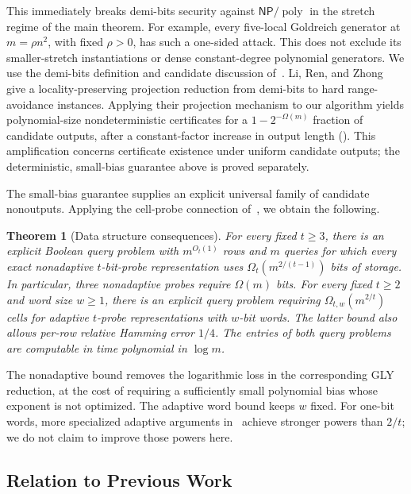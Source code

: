 \documentclass[letterpaper,11pt]{article}
\newtheorem{theorem}{Theorem}
\theoremstyle{definition}
\newcommand{\NP}{\mathsf{NP}}
\DeclareMathOperator{\poly}{poly}
\begin{document}
This immediately breaks demi-bits security against $\NP/\poly$
in the stretch regime of the main theorem. For example, every
five-local Goldreich generator at $m=\rho n^2$, with fixed $\rho>0$,
has such a one-sided attack. This does not exclude its smaller-stretch
instantiations or dense constant-degree polynomial generators.
We use the demi-bits definition and candidate discussion
of~\cite{RWZ26}. Li, Ren, and Zhong~\cite{LRZ26} give a
locality-preserving projection reduction from demi-bits to hard
range-avoidance instances. Applying their projection mechanism to
our algorithm yields polynomial-size nondeterministic certificates
for a $1-2^{-\Omega(m)}$ fraction of candidate outputs, after a
constant-factor increase in output length
(). This amplification concerns
certificate existence under uniform candidate outputs; the
deterministic, small-bias guarantee above is proved separately.

The small-bias guarantee supplies an explicit universal family of
candidate nonoutputs. Applying the cell-probe connection
of~\cite{KPI25,GLY26}, we obtain the following.

\begin{theorem}[Data structure consequences]\label{thm:ds-intro}
For every fixed $t\ge3$, there is an explicit Boolean query problem
with $m^{O_t(1)}$ rows and $m$ queries for which every exact
nonadaptive $t$-bit-probe representation uses
$\Omega_t(m^{2/(t-1)})$ bits of storage. In particular, three
nonadaptive probes require $\Omega(m)$ bits.
For every fixed $t\ge2$ and word size $w\ge1$, there is an explicit
query problem requiring $\Omega_{t,w}(m^{2/t})$ cells for adaptive
$t$-probe representations with $w$-bit words.
The latter bound also allows per-row relative Hamming error $1/4$.
The entries of both query problems are computable in time polynomial
in $\log m$.
\end{theorem}

The nonadaptive bound removes the logarithmic loss in the
corresponding GLY reduction, at the cost of requiring a sufficiently
small polynomial bias whose exponent is not optimized. The adaptive
word bound keeps $w$ fixed. For one-bit words, more specialized
adaptive arguments in~\cite{GLY26} achieve stronger powers than
$2/t$; we do not claim to improve those powers here.

\subsection{Relation to Previous Work}
\end{document}
